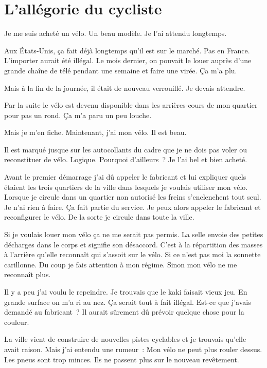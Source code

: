 \chapter{L'allégorie du cycliste}\label{cycliste}

Je me suis acheté un vélo. Un beau modèle. Je l’ai attendu longtemps.

Aux États-Unis, ça fait déjà longtemps qu’il est sur le marché. Pas en France. L’importer aurait été illégal. Le mois dernier, on pouvait le louer auprès d’une grande chaîne de télé pendant une
semaine et faire une virée. Ça m’a plu.

Mais à la fin de la journée, il était de nouveau verrouillé. Je devais attendre.

Par la suite le vélo est devenu disponible dans les arrières-cours de mon quartier pour pas un rond. Ça m’a paru un peu louche.

Mais je m’en fiche. Maintenant, j’ai mon vélo. Il est beau.

Il est marqué jusque sur les autocollants du cadre que je ne dois pas voler ou reconstituer de vélo. Logique. Pourquoi d’ailleurs~? Je l’ai bel et bien acheté.

Avant le premier démarrage j’ai dû appeler le fabricant et lui expliquer quels étaient les trois quartiers de la ville dans lesquels je voulais utiliser mon vélo. Lorsque je circule dans un quartier
non autorisé les freins s’enclenchent tout seul. Je n’ai rien à faire. Ça fait partie du service. Je peux alors appeler le fabricant et reconfigurer le vélo. De la sorte je circule dans toute la
ville.

Si je voulais louer mon vélo ça ne me serait pas permis. La selle envoie des petites décharges dans le corps et signifie son désaccord. C’est à la répartition des masses à l’arrière qu’elle reconnaît
qui s’assoit sur le vélo. Si ce n’est pas moi la sonnette carillonne. Du coup je fais attention à mon régime. Sinon mon vélo ne me reconnaît plus.

Il y a peu j’ai voulu le repeindre. Je trouvais que le kaki faisait vieux jeu. En grande surface on m’a ri au nez. Ça serait tout à fait illégal. Est-ce que j’avais demandé au fabricant~? Il aurait
sûrement dû prévoir quelque chose pour la couleur.

La ville vient de construire de nouvelles pistes cyclables et je trouvais qu’elle avait raison. Mais j’ai entendu une rumeur~: Mon vélo ne peut plus rouler dessus. Les pneus sont trop minces. Ils ne
passent plus sur le nouveau revêtement.

